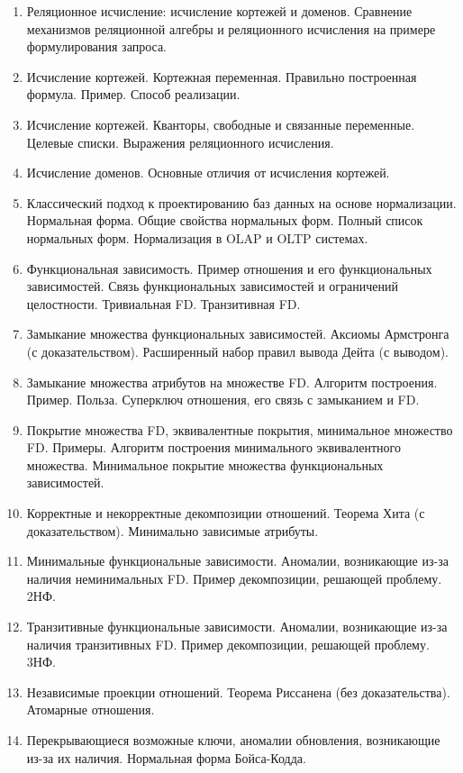 \documentclass[a4paper,12pt]{article}
\begin{document}
\begin{titlepage}
\begin{multicols}{3}
\begin{enumerate}[label=\arabic*.]
            \item Реляционное исчисление: исчисление кортежей и доменов. Сравнение механизмов реляционной алгебры и реляционного исчисления на примере формулирования запроса.
            \item Исчисление кортежей. Кортежная переменная. Правильно построенная формула. Пример. Способ реализации.
            \item Исчисление кортежей. Кванторы, свободные и связанные переменные. Целевые списки. Выражения реляционного исчисления.
            \item Исчисление доменов. Основные отличия от исчисления кортежей.
            \item Классический подход к проектированию баз данных на основе нормализации. Нормальная форма. Общие свойства нормальных форм. Полный список нормальных форм. Нормализация в OLAP и OLTP системах.
            \item Функциональная зависимость. Пример отношения и его функциональных зависимостей. Связь функциональных зависимостей и ограничений целостности. Тривиальная FD. Транзитивная FD.
            \item Замыкание множества функциональных зависимостей. Аксиомы Армстронга (с доказательством). Расширенный набор правил вывода Дейта (с выводом).
            \item Замыкание множества атрибутов на множестве FD. Алгоритм построения. Пример. Польза. Суперключ отношения, его связь с замыканием и FD.
            \item Покрытие множества FD, эквивалентные покрытия, минимальное множество FD. Примеры. Алгоритм построения минимального эквивалентного множества. Минимальное покрытие множества функциональных зависимостей.
            \item Корректные и некорректные декомпозиции отношений. Теорема Хита (с доказательством). Минимально зависимые атрибуты.
            \item Минимальные функциональные зависимости. Аномалии, возникающие из-за наличия неминимальных FD. Пример декомпозиции, решающей проблему. 2НФ.
            \item Транзитивные функциональные зависимости. Аномалии, возникающие из-за наличия транзитивных FD. Пример декомпозиции, решающей проблему. 3НФ.
            \item Независимые проекции отношений. Теорема Риссанена (без доказательства). Атомарные отношения.
            \item Перекрывающиеся возможные ключи, аномалии обновления, возникающие из-за их наличия. Нормальная форма Бойса-Кодда.

\end{enumerate}
\end{multicols}
\end{titlepage}
\end{document}
